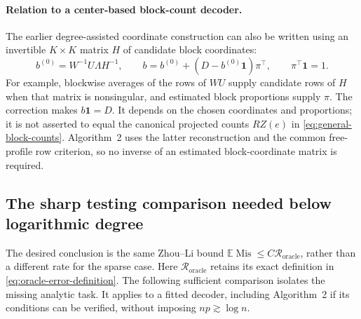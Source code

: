 \documentclass[11pt]{article}
\theoremstyle{definition}
\theoremstyle{remark}
\newcommand{\Mis}{\operatorname{Mis}}
\newcommand{\E}{\mathbb E}
\newcommand{\Roracle}{\mathcal R_{\mathrm{oracle}}}
\newcommand{\one}{\mathbf 1}
\numberwithin{equation}{section}
\begin{document}
\paragraph{Relation to a center-based block-count decoder.}
The earlier degree-assisted coordinate construction can also be written
using an invertible $K\times K$ matrix $H$ of candidate block coordinates:
\[
 b^{(0)}=W^{-1}U\Lambda H^{-1},\qquad
 b=b^{(0)}+(D-b^{(0)}\one)\pi^\top,
 \qquad \pi^\top\one=1.
\]
For example, blockwise averages of the rows of $WU$ supply candidate rows
of $H$ when that matrix is nonsingular, and estimated block proportions
supply $\pi$. The correction makes $b\one=D$. It depends on the chosen
coordinates and proportions; it is not asserted to equal the canonical
projected counts $RZ(e)$ in \eqref{eq:general-block-counts}. Algorithm~2
uses the latter reconstruction and the common free-profile row criterion,
so no inverse of an estimated block-coordinate matrix is required.

\subsection{The sharp testing comparison needed below logarithmic degree}
The desired conclusion is the same Zhou--Li bound
$\E\Mis\le C\Roracle$, rather than a different rate for the sparse case.
Here $\Roracle$ retains its exact definition in \eqref{eq:oracle-error-definition}.
The following sufficient comparison isolates the missing analytic task.
It applies to a fitted decoder, including Algorithm~2 if its conditions
can be verified, without imposing $np\gtrsim\log n$.
\end{document}

